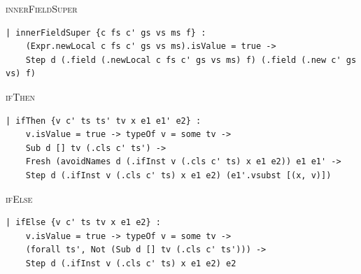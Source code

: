 \begin{cmp}{\textsc{innerFieldSuper}}
\begin{paperside}
\end{paperside}
\begin{leanside}
\begin{lstlisting}[style=leanside]
| innerFieldSuper {c fs c' gs vs ms f} :
    (Expr.newLocal c fs c' gs vs ms).isValue = true ->
    Step d (.field (.newLocal c fs c' gs vs ms) f) (.field (.new c' gs vs) f)
\end{lstlisting}
\end{leanside}
\end{cmp}

\begin{cmp}{\textsc{ifThen}}
\begin{paperside}
\end{paperside}
\begin{leanside}
\begin{lstlisting}[style=leanside]
| ifThen {v c' ts ts' tv x e1 e1' e2} :
    v.isValue = true -> typeOf v = some tv ->
    Sub d [] tv (.cls c' ts') ->
    Fresh (avoidNames d (.ifInst v (.cls c' ts) x e1 e2)) e1 e1' ->
    Step d (.ifInst v (.cls c' ts) x e1 e2) (e1'.vsubst [(x, v)])
\end{lstlisting}
\end{leanside}
\end{cmp}

\begin{cmp}{\textsc{ifElse}}
\begin{paperside}
\end{paperside}
\begin{leanside}
\begin{lstlisting}[style=leanside]
| ifElse {v c' ts tv x e1 e2} :
    v.isValue = true -> typeOf v = some tv ->
    (forall ts', Not (Sub d [] tv (.cls c' ts'))) ->
    Step d (.ifInst v (.cls c' ts) x e1 e2) e2
\end{lstlisting}
\end{leanside}
\end{cmp}

